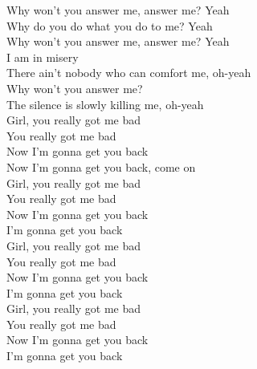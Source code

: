 Why won't you answer me, answer me? Yeah \\
Why do you do what you do to me? Yeah \\
Why won't you answer me, answer me? Yeah \\
I am in misery \\
There ain't nobody who can comfort me, oh-yeah \\
Why won't you answer me? \\
The silence is slowly killing me, oh-yeah \\
Girl, you really got me bad \\
You really got me bad \\
Now I'm gonna get you back \\
Now I'm gonna get you back, come on \\
Girl, you really got me bad \\
You really got me bad \\
Now I'm gonna get you back \\
I'm gonna get you back \\
Girl, you really got me bad \\
You really got me bad \\
Now I'm gonna get you back \\
I'm gonna get you back \\
Girl, you really got me bad \\
You really got me bad \\
Now I'm gonna get you back \\
I'm gonna get you back \\
